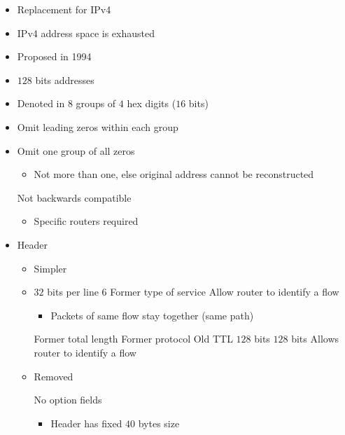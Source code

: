 \begin{itemize}
    \item Replacement for IPv4
    \item IPv4 address space is exhausted
    \item Proposed in 1994
    \item $128$ bits addresses
    \item Denoted in $8$ groups of $4$ hex digits ($16$ bits)
    \item Omit leading zeros within each group
    \item Omit one group of all zeros
        \begin{itemize}
            \item Not more than one, else original address cannot be reconstructed
        \end{itemize}
    \icon Not backwards compatible
        \begin{itemize}
            \item Specific routers required
        \end{itemize}
    \item Header
        \begin{itemize}
            \item Simpler
            \item $32$ bits per line
             6
             Former type of service
             Allow router to identify a flow
            \begin{itemize}
                \item Packets of same flow stay together (same path)
            \end{itemize}
             Former total length
             Former protocol
             Old TTL
             $128$ bits
             $128$ bits
             Allows router to identify a flow
            \item Removed
                \begin{itemize}
                        \begin{itemize}
                             No option fields
                                \begin{itemize}
                                    \item Header has fixed $40$ bytes size

\end{itemize}
\end{itemize}
\end{itemize}
\end{itemize}
\end{itemize}
